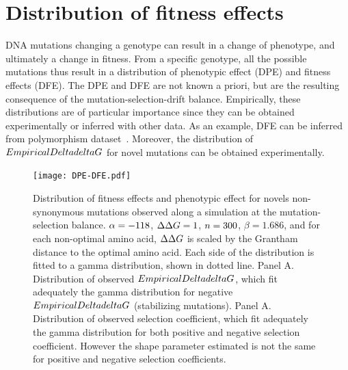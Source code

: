 \section{Distribution of fitness effects}
\label{sec:distribution-of-fitness-effects}

DNA mutations changing a genotype can result in a change of phenotype, and ultimately a change in fitness.
From a specific genotype, all the possible mutations thus result in a distribution of phenotypic effect (DPE) and fitness effects (\acrshort{DFE}).
The DPE and \acrshort{DFE} are not known a priori, but are the resulting consequence of the mutation-selection-drift balance.
Empirically, these distributions are of particular importance since they can be obtained experimentally or inferred with other data.
As an example, \acrshort{DFE} can be inferred from polymorphism dataset~\citep{Eyre-walker2007, Galtier2016}.
Moreover, the distribution of $\\EmpiricalDeltadeltaG$ for novel mutations can be obtained experimentally.

\begin{figure}[H]
	\centering
	\texttt{[image: DPE-DFE.pdf]}
	\caption[Distribution of fitness effects and phenotypic effect]{
	Distribution of fitness effects and phenotypic effect for novels non-synonymous mutations observed along a simulation at the mutation-selection balance.
	$\alpha=-118$, $\Delta \Delta G=1$, $n=300$, $\beta=1.686$, and for each non-optimal amino acid, $\Delta \Delta G$ is scaled by the Grantham distance to the optimal amino acid.
	Each side of the distribution is fitted to a gamma distribution, shown in dotted line.
	Panel A. Distribution of observed $\\EmpiricalDeltadeltaG$, which fit adequately the gamma distribution for negative $\\EmpiricalDeltadeltaG$ (stabilizing mutations).
	Panel A. Distribution of observed selection coefficient, which fit adequately the gamma distribution for both positive and negative selection coefficient. However the shape parameter estimated is not the same for positive and negative selection coefficients.
	}
\end{figure}